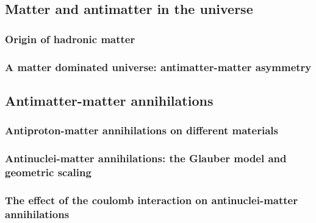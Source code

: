 \subsection{Matter and antimatter in the universe}

\subsubsection{Origin of hadronic matter}

\subsubsection{A matter dominated universe: antimatter-matter asymmetry}

\subsection{Antimatter-matter annihilations}
    
\subsubsection{Antiproton-matter annihilations on different materials}
\subsubsection{Antinuclei-matter annihilations: the Glauber model and geometric scaling}
\subsubsection{The effect of the coulomb interaction on antinuclei-matter annihilations}
